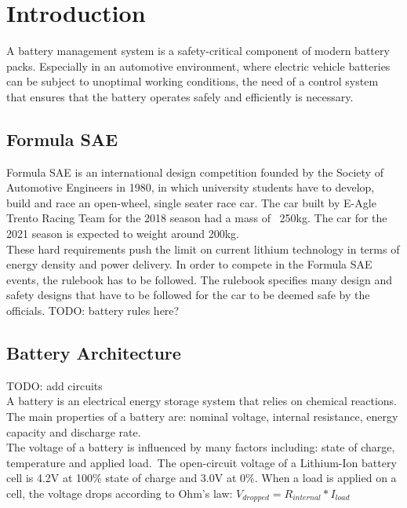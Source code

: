 \chapter{Introduction}
\label{cha:intro}
A battery management system is a safety-critical component of modern battery packs. Especially in an automotive environment, where electric vehicle batteries can be subject to unoptimal working conditions, the need of a control system that ensures that the battery operates safely and efficiently is necessary.

\section{Formula SAE}
Formula SAE is an international design competition founded by the Society of Automotive Engineers in 1980, in which university students have to develop, build and race an open-wheel, single seater race car.
The car built by E-Agle Trento Racing Team for the 2018 season had a mass of ~250kg. The car for the 2021 season is expected to weight around 200kg.\\
These hard requirements push the limit on current lithium technology in terms of energy density and power delivery.
In order to compete in the Formula SAE events, the rulebook has to be followed. The rulebook specifies many design and safety designs that have to be followed for the car to be deemed safe by the officials.
TODO: battery rules here?\\

\section{Battery Architecture}
TODO: add circuits\\
A battery is an electrical energy storage system that relies on chemical reactions. The main properties of a battery are: nominal voltage, internal resistance, energy capacity and discharge rate.\\
The voltage of a battery is influenced by many factors including: state of charge, temperature and applied load.\ The open-circuit voltage of a Lithium-Ion battery cell is 4.2V at 100\% state of charge and 3.0V at 0\%.
When a load is applied on a cell, the voltage drops according to Ohm's law: $V_{dropped} = R_{internal}*I_{load}$

